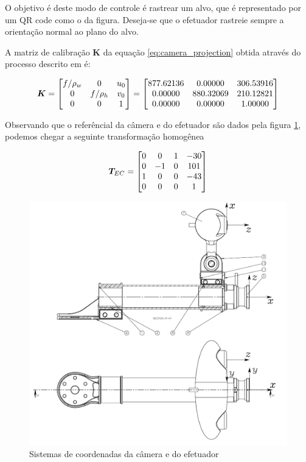 O objetivo é deste modo de controle é rastrear um alvo, que é representado por um QR code como o da figura. Deseja-se que o efetuador rastreie sempre a orientação normal ao plano do alvo.

A matriz de calibração $\bm{K}$ da equação \eqref{eq:camera_projection} obtida através do processo descrito em \cite{calibration_tutorial} é:

\begin{equation}
\bm{K} = \begin{bmatrix}
	f/\rho_w & 0 & u_0 \\
	0        & f/\rho_h &v_0 \\
	0 & 0 & 1 \\
\end{bmatrix}
=
\begin{bmatrix}
	877.62136 & 0.00000 & 306.53916 \\
	0.00000   & 880.32069 & 210.12821 \\
	0.00000   & 0.00000 & 1.00000 \\	
\end{bmatrix}	
\end{equation}

Observando que o referêncial da câmera e do efetuador são dados pela figura \ref{fig:camera_ref}, podemos chegar a seguinte transformação homogênea

\begin{equation} \label{eq:tec}
\bm{T}_{EC} = \begin{bmatrix}
	0 & 0 & 1 & -30 \\
	0 & -1 & 0 & 101 \\
	1 &  0 & 0 & -43 \\
	0 &  0 & 0 &  1
\end{bmatrix}
\end{equation}

\begin{figure}[!h]
  \centering
  \includegraphics[width=0.8\linewidth]{./img/camera.png}
  \caption{Sistemas de coordenadas da câmera e do efetuador}
  \label{fig:camera_ref}
\end{figure}

